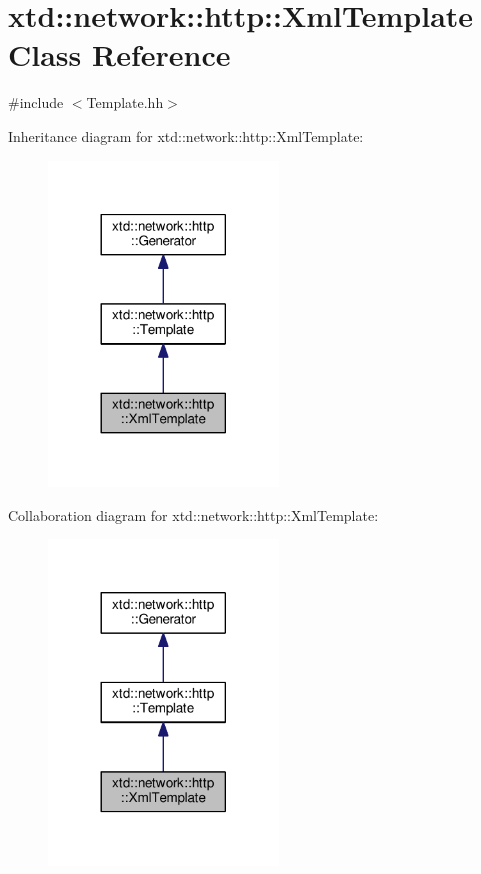 \hypertarget{classxtd_1_1network_1_1http_1_1XmlTemplate}{}\section{xtd\+:\+:network\+:\+:http\+:\+:Xml\+Template Class Reference}
\label{classxtd_1_1network_1_1http_1_1XmlTemplate}


{\ttfamily \#include $<$Template.\+hh$>$}



Inheritance diagram for xtd\+:\+:network\+:\+:http\+:\+:Xml\+Template\+:
\nopagebreak
\begin{figure}[H]
\begin{center}
\leavevmode
\includegraphics[width=173pt]{classxtd_1_1network_1_1http_1_1XmlTemplate__inherit__graph}
\end{center}
\end{figure}


Collaboration diagram for xtd\+:\+:network\+:\+:http\+:\+:Xml\+Template\+:
\nopagebreak
\begin{figure}[H]
\begin{center}
\leavevmode
\includegraphics[width=173pt]{classxtd_1_1network_1_1http_1_1XmlTemplate__coll__graph}
\end{center}
\end{figure}
